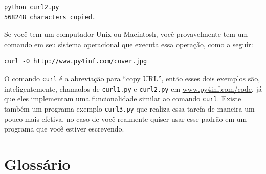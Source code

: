 \beforeverb
\begin{verbatim}
python curl2.py 
568248 characters copied.
\end{verbatim}
\afterverb

Se você tem um computador Unix ou Macintosh, você provavelmente tem um
comando em seu sistema operacional que executa essa operação,
como a seguir:

\beforeverb
\begin{verbatim}
curl -O http://www.py4inf.com/cover.jpg
\end{verbatim}
\afterverb

O comando {\tt curl} é a abreviação para ``copy URL'', então esses dois 
exemplos são, inteligentemente, chamados de {\tt curl1.py} e {\tt curl2.py} em 
\url{www.py4inf.com/code}, já que eles implementam uma funcionalidade similar
ao comando {\tt curl}.  Existe também um programa exemplo {\tt curl3.py} que
realiza essa tarefa de maneira um pouco mais efetiva, no caso de você
realmente quiser usar esse padrão em um programa que você estiver escrevendo.

\section{Glossário}

